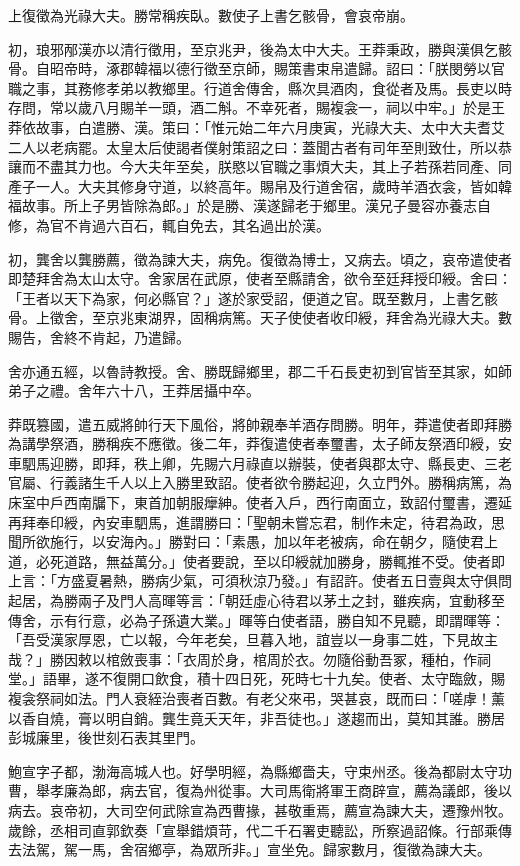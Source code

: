 \begin{pinyinscope}
上復徵為光祿大夫。勝常稱疾臥。數使子上書乞骸骨，會哀帝崩。

初，琅邪邴漢亦以清行徵用，至京兆尹，後為太中大夫。王莽秉政，勝與漢俱乞骸骨。自昭帝時，涿郡韓福以德行徵至京師，賜策書束帛遣歸。詔曰：「朕閔勞以官職之事，其務修孝弟以教鄉里。行道舍傳舍，縣次具酒肉，食從者及馬。長吏以時存問，常以歲八月賜羊一頭，酒二斛。不幸死者，賜複衾一，祠以中牢。」於是王莽依故事，白遣勝、漢。策曰：「惟元始二年六月庚寅，光祿大夫、太中大夫耆艾二人以老病罷。太皇太后使謁者僕射策詔之曰：蓋聞古者有司年至則致仕，所以恭讓而不盡其力也。今大夫年至矣，朕愍以官職之事煩大夫，其上子若孫若同產、同產子一人。大夫其修身守道，以終高年。賜帛及行道舍宿，歲時羊酒衣衾，皆如韓福故事。所上子男皆除為郎。」於是勝、漢遂歸老于鄉里。漢兄子曼容亦養志自修，為官不肯過六百石，輒自免去，其名過出於漢。

初，龔舍以龔勝薦，徵為諫大夫，病免。復徵為博士，又病去。頃之，哀帝遣使者即楚拜舍為太山太守。舍家居在武原，使者至縣請舍，欲令至廷拜授印綬。舍曰：「王者以天下為家，何必縣官？」遂於家受詔，便道之官。既至數月，上書乞骸骨。上徵舍，至京兆東湖界，固稱病篤。天子使使者收印綬，拜舍為光祿大夫。數賜告，舍終不肯起，乃遣歸。

舍亦通五經，以魯詩教授。舍、勝既歸鄉里，郡二千石長吏初到官皆至其家，如師弟子之禮。舍年六十八，王莽居攝中卒。

莽既篡國，遣五威將帥行天下風俗，將帥親奉羊酒存問勝。明年，莽遣使者即拜勝為講學祭酒，勝稱疾不應徵。後二年，莽復遣使者奉璽書，太子師友祭酒印綬，安車駟馬迎勝，即拜，秩上卿，先賜六月祿直以辦裝，使者與郡太守、縣長吏、三老官屬、行義諸生千人以上入勝里致詔。使者欲令勝起迎，久立門外。勝稱病篤，為床室中戶西南牖下，東首加朝服癴紳。使者入戶，西行南面立，致詔付璽書，遷延再拜奉印綬，內安車駟馬，進謂勝曰：「聖朝未嘗忘君，制作未定，待君為政，思聞所欲施行，以安海內。」勝對曰：「素愚，加以年老被病，命在朝夕，隨使君上道，必死道路，無益萬分。」使者要說，至以印綬就加勝身，勝輒推不受。使者即上言：「方盛夏暑熱，勝病少氣，可須秋涼乃發。」有詔許。使者五日壹與太守俱問起居，為勝兩子及門人高暉等言：「朝廷虛心待君以茅土之封，雖疾病，宜動移至傳舍，示有行意，必為子孫遺大業。」暉等白使者語，勝自知不見聽，即謂暉等：「吾受漢家厚恩，亡以報，今年老矣，旦暮入地，誼豈以一身事二姓，下見故主哉？」勝因敕以棺斂喪事：「衣周於身，棺周於衣。勿隨俗動吾冢，種柏，作祠堂。」語畢，遂不復開口飲食，積十四日死，死時七十九矣。使者、太守臨斂，賜複衾祭祠如法。門人衰絰治喪者百數。有老父來弔，哭甚哀，既而曰：「嗟虖！薰以香自燒，膏以明自銷。龔生竟夭天年，非吾徒也。」遂趨而出，莫知其誰。勝居彭城廉里，後世刻石表其里門。

鮑宣字子都，渤海高城人也。好學明經，為縣鄉嗇夫，守束州丞。後為都尉太守功曹，舉孝廉為郎，病去官，復為州從事。大司馬衛將軍王商辟宣，薦為議郎，後以病去。哀帝初，大司空何武除宣為西曹掾，甚敬重焉，薦宣為諫大夫，遷豫州牧。歲餘，丞相司直郭欽奏「宣舉錯煩苛，代二千石署吏聽訟，所察過詔條。行部乘傳去法駕，駕一馬，舍宿鄉亭，為眾所非。」宣坐免。歸家數月，復徵為諫大夫。


\end{pinyinscope}
